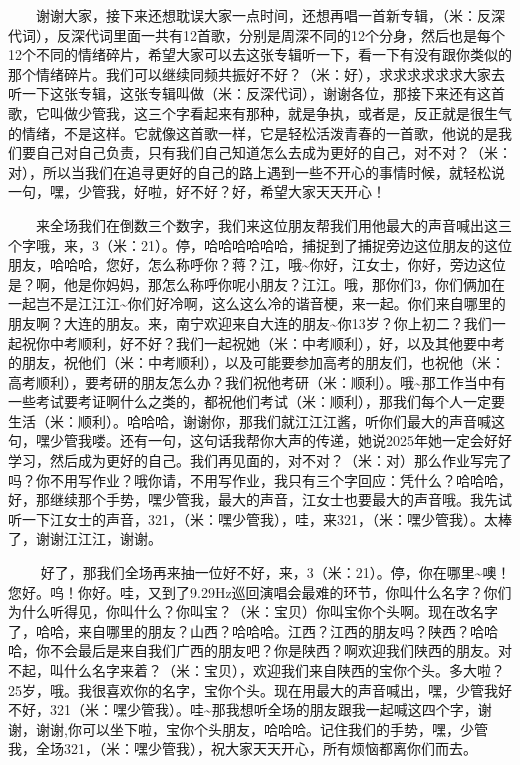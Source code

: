 \documentclass[]{ctexbook}
\begin{document}
  谢谢大家，接下来还想耽误大家一点时间，还想再唱一首新专辑，（米：反深代词），反深代词里面一共有12首歌，分别是周深不同的12个分身，然后也是每个12个不同的情绪碎片，希望大家可以去这张专辑听一下，看一下有没有跟你类似的那个情绪碎片。我们可以继续同频共振好不好？（米：好），求求求求求求大家去听一下这张专辑，这张专辑叫做（米：反深代词），谢谢各位，那接下来还有这首歌，它叫做少管我，这三个字看起来有那种，就是争执，或者是，反正就是很生气的情绪，不是这样。它就像这首歌一样，它是轻松活泼青春的一首歌，他说的是我们要自己对自己负责，只有我们自己知道怎么去成为更好的自己，对不对？（米：对），所以当我们在追寻更好的自己的路上遇到一些不开心的事情时候，就轻松说一句，嘿，少管我，好啦，好不好？好，希望大家天天开心！

  来全场我们在倒数三个数字，我们来这位朋友帮我们用他最大的声音喊出这三个字哦，来，3（米：21）。停，哈哈哈哈哈哈，捕捉到了捕捉旁边这位朋友的这位朋友，哈哈哈，您好，怎么称呼你？蒋？江，哦\textasciitilde 你好，江女士，你好，旁边这位是？啊，他是你妈妈，那怎么称呼你呢小朋友？江江。哦，那你们3，你们俩加在一起岂不是江江江\textasciitilde 你们好冷啊，这么这么冷的谐音梗，来一起。你们来自哪里的朋友啊？大连的朋友。来，南宁欢迎来自大连的朋友\textasciitilde 你13岁？你上初二？我们一起祝你中考顺利，好不好？我们一起祝她（米：中考顺利），好，以及其他要中考的朋友，祝他们（米：中考顺利），以及可能要参加高考的朋友们，也祝他（米：高考顺利），要考研的朋友怎么办？我们祝他考研（米：顺利）。哦\textasciitilde 那工作当中有一些考试要考证啊什么之类的，都祝他们考试（米：顺利），那我们每个人一定要生活（米：顺利）。哈哈哈，谢谢你，那我们就江江江酱，听你们最大的声音喊这句，嘿少管我喽。还有一句，这句话我帮你大声的传递，她说2025年她一定会好好学习，然后成为更好的自己。我们再见面的，对不对？（米：对）那么作业写完了吗？你不用写作业？哦你请，不用写作业，我只有三个字回应：凭什么？哈哈哈，好，那继续那个手势，嘿少管我，最大的声音，江女士也要最大的声音哦。我先试听一下江女士的声音，321，（米：嘿少管我），哇，来321，（米：嘿少管我）。太棒了，谢谢江江江，谢谢。

   好了，那我们全场再来抽一位好不好，来，3（米：21）。停，你在哪里\textasciitilde 噢！您好。呜！你好。哇，又到了9.29Hz巡回演唱会最难的环节，你叫什么名字？你们为什么听得见，你叫什么？你叫宝？（米：宝贝）你叫宝你个头啊。现在改名字了，哈哈，来自哪里的朋友？山西？哈哈哈。江西？江西的朋友吗？陕西？哈哈哈，你不会最后是来自我们广西的朋友吧？你是陕西？啊欢迎我们陕西的朋友。对不起，叫什么名字来着？（米：宝贝），欢迎我们来自陕西的宝你个头。多大啦？25岁，哦。我很喜欢你的名字，宝你个头。现在用最大的声音喊出，嘿，少管我好不好，321（米：嘿少管我）。哇\textasciitilde 那我想听全场的朋友跟我一起喊这四个字，谢谢，谢谢,你可以坐下啦，宝你个头朋友，哈哈哈。记住我们的手势，嘿，少管我，全场321，（米：嘿少管我），祝大家天天开心，所有烦恼都离你们而去。
\end{document}
